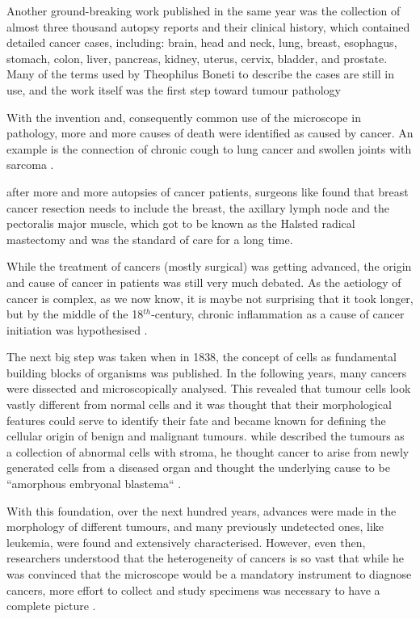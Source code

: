 Another ground-breaking work published in the same year was the collection of almost three thousand autopsy reports and their clinical history, which contained  detailed cancer cases, including: brain, head and neck, lung, breast, esophagus, stomach, colon, liver, pancreas, kidney, uterus, cervix, bladder, and prostate. Many of the terms used by Theophilus Boneti to describe the cases are still in use, and the work itself was the first step toward tumour pathology \cite{Hajdu2010a}

With the invention and, consequently common use of the microscope in pathology, more and more causes of death were identified as caused by cancer. An example is the connection of chronic cough to lung cancer and swollen joints with sarcoma \cite{Etmueller2018}.

 after more and more autopsies of cancer patients, surgeons like \textcite{Heister1747} found that breast cancer resection needs to include the breast, the axillary lymph node and the pectoralis major muscle, which got to be known as the Halsted radical mastectomy and was the standard of care for a long time.

While the treatment of cancers (mostly surgical) was getting  advanced, the origin and cause of cancer in patients was still very much debated. As the aetiology of cancer is complex, as we now know, it is maybe not surprising that it took longer, but by  the middle of the 18$^{th}$-century, chronic inflammation as a cause of cancer initiation was hypothesised \cite{Hajdu2010b}.

The next big step was taken when in 1838, the concept of cells as fundamental building blocks of organisms was published. In the following years, many cancers were dissected and microscopically analysed. This  revealed that tumour cells look vastly different from normal cells and it was thought that their morphological features could serve to identify their fate and became known for defining the cellular origin of benign and malignant tumours.  while \citeauthor{Mueller1838} described the tumours as a collection of abnormal cells with stroma, he thought cancer to arise from newly generated cells from a diseased organ and thought the underlying cause to be ``amorphous embryonal blastema`` \cite{Mueller1838}.

With this foundation, over the next hundred years,  advances were made in the morphology of different tumours, and many previously undetected ones, like leukemia, were found and extensively characterised. However, even then,  researchers understood that the heterogeneity of cancers is so vast that while he was convinced that the microscope would be a mandatory instrument to diagnose cancers, more effort to collect and study specimens was necessary to have a complete picture \cite{Bennett1849}.

